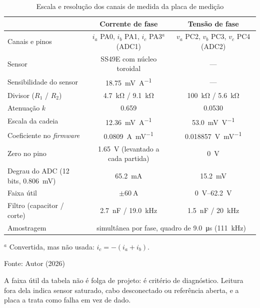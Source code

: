 \begin{table}[H]
    \centering
    \caption{Escala e resolução dos canais de medida da placa de medição}
    \label{tab:resultado_calibracao_canal_same}
    \footnotesize
    \setlength{\tabcolsep}{3.5pt}
    \begin{tabular}{lcc}
        \toprule
        & \textbf{Corrente de fase} & \textbf{Tensão de fase} \\
        \midrule
        Canais e pinos & $i_a$ PA0, $i_b$ PA1, $i_c$ PA3$^{a}$ (ADC1) & $v_a$ PC2, $v_b$ PC3, $v_c$ PC4 (ADC2) \\
        Sensor & SS49E com núcleo toroidal & --- \\
        Sensibilidade do sensor & \SI{18,75}{\milli\volt\per\ampere} & --- \\
        Divisor ($R_1$ / $R_2$) & \SI{4,7}{\kilo\ohm} / \SI{9,1}{\kilo\ohm} & \SI{100}{\kilo\ohm} / \SI{5,6}{\kilo\ohm} \\
        Atenuação $k$ & \num{0,659} & \num{0,0530} \\
        Escala da cadeia & \SI{12,36}{\milli\volt\per\ampere} & \SI{53,0}{\milli\volt\per\volt} \\
        Coeficiente no \textit{firmware} & \SI{0,0809}{\ampere\per\milli\volt} & \SI{0,018857}{\volt\per\milli\volt} \\
        Zero no pino & \SI{1,65}{\volt} (levantado a cada partida) & \SI{0}{\volt} \\
        Degrau do ADC (12 bits, \SI{0,806}{\milli\volt}) & \SI{65,2}{\milli\ampere} & \SI{15,2}{\milli\volt} \\
        Faixa útil & $\pm\SI{60}{\ampere}$ & \SIrange{0}{62,2}{\volt} \\
        Filtro (capacitor / corte) & \SI{2,7}{\nano\farad} / \SI{19,0}{\kilo\hertz} & \SI{1,5}{\nano\farad} / \SI{20}{\kilo\hertz} \\
        Amostragem & \multicolumn{2}{c}{simultânea por fase, quadro de \SI{9,0}{\micro\second} (\SI{111}{\kilo\hertz})} \\
        \bottomrule
    \end{tabular}

    \vspace{2pt}
    {\footnotesize $^{a}$ Convertida, mas não usada: $i_c = -(i_a + i_b)$.}

    {\small Fonte: Autor (2026)}
\end{table}

A faixa útil da tabela não é folga de projeto: é critério de diagnóstico.
Leitura fora dela indica sensor saturado, cabo desconectado ou referência
aberta, e a placa a trata como falha em vez de dado.

